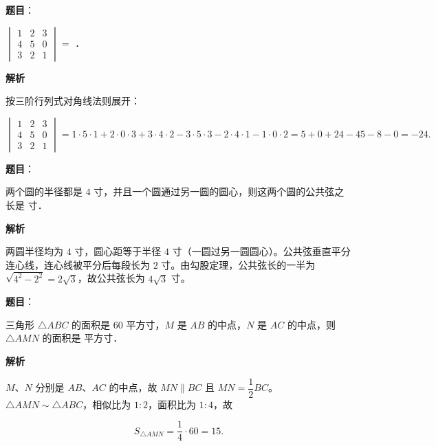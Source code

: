 \begin{answer}

\textbf{题目}：

$\begin{vmatrix}1&2&3\\4&5&0\\3&2&1\end{vmatrix}=$ \gkblank{}．

\textbf{解析}

按三阶行列式对角线法则展开：

\nopagebreak[4]
\[
\begin{vmatrix}1&2&3\\4&5&0\\3&2&1\end{vmatrix}
=1\cdot5\cdot1+2\cdot0\cdot3+3\cdot4\cdot2-3\cdot5\cdot3-2\cdot4\cdot1-1\cdot0\cdot2
=5+0+24-45-8-0=-24.
\]


\end{answer}
\begin{answer}

\textbf{题目}：

两个圆的半径都是 $4$ 寸，并且一个圆通过另一圆的圆心，则这两个圆的公共弦之长是 \gkblank{} 寸．

\textbf{解析}

两圆半径均为 $4$ 寸，圆心距等于半径 $4$ 寸（一圆过另一圆圆心）。公共弦垂直平分连心线，连心线被平分后每段长为 $2$ 寸。由勾股定理，公共弦长的一半为 $\sqrt{4^2-2^2}=2\sqrt3$，故公共弦长为 $4\sqrt3$ 寸。


\end{answer}
\begin{answer}

\textbf{题目}：

三角形 $\triangle ABC$ 的面积是 $60$ \mbox{平方寸}，$M$ 是 $AB$ 的中点，$N$ 是 $AC$ 的中点，则 $\triangle AMN$ 的面积是 \gkblank{} \mbox{平方寸}．

\textbf{解析}

$M$、$N$ 分别是 $AB$、$AC$ 的中点，故 $MN\parallel BC$ 且 $MN=\dfrac12BC$。$\triangle AMN\sim\triangle ABC$，相似比为 $1:2$，面积比为 $1:4$，故

\nopagebreak[4]
\[
S_{\triangle AMN}=\dfrac14\cdot60=15.
\]


\end{answer}
